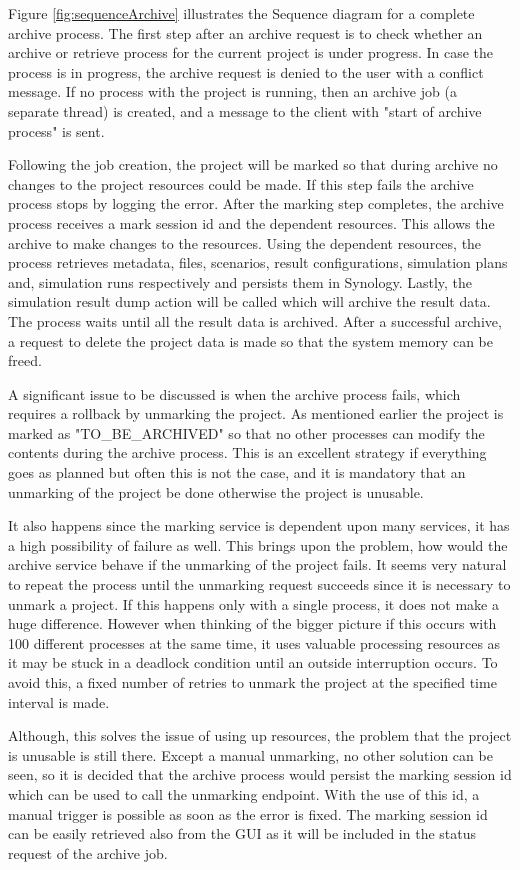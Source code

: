 Figure \ref{fig:sequenceArchive} illustrates the Sequence diagram for a complete archive process. The first step after an archive request is to check
whether an archive or retrieve process for the current project is under progress. In case the process is in progress, the archive request is denied to the
user with a conflict message. If no process with the project is running, then an archive job (a separate thread) is created, and a message to the client with "start of archive process" is
sent. 

Following the job creation, the project will be marked so that during archive no changes to the project resources could be made. If this step fails the archive 
process stops by logging the error. After the marking step completes, the archive process receives a mark session id and the dependent resources. This allows the archive to make
changes to the resources. Using the dependent resources, the process retrieves metadata, files, scenarios, result configurations, simulation plans and, simulation runs 
respectively and persists them in Synology. Lastly, the simulation result dump action will be called which will archive the result data. The process waits until
all the result data is archived. After a successful archive, a request to delete the project data is made so that the system memory can be freed.

A significant issue to be discussed is when the archive process fails, which requires a rollback by unmarking the project. As mentioned earlier the project is
marked as "TO\_BE\_ARCHIVED" so that no other processes can modify the contents during the archive process. This is an excellent strategy if everything goes as planned but 
often this is not the case, and it is mandatory that an unmarking of the project be done otherwise the project is unusable. 

It also happens since the
marking service is dependent upon many services, it has a high possibility of failure as well. This brings upon the problem, how would the archive service behave if the
unmarking of the project fails. It seems very natural to repeat the process until the unmarking request succeeds since it is necessary to unmark
a project. If this happens only with a single process, it does not make a huge difference. However when thinking of the bigger picture if this 
occurs with 100 different processes at the same time, it uses valuable processing resources as it may be stuck in a deadlock condition until an outside interruption occurs. 
To avoid this, a fixed number of retries to unmark the project at the specified time interval is made. 

Although, this solves the issue of using up resources, the problem that the project is unusable is still there. Except a manual unmarking, no other solution 
can be seen, so 
it is decided that the archive process would persist the marking session id which can be used to call the unmarking endpoint. With the use of this id, a manual 
trigger is possible as soon as the error is fixed. The marking session id can be easily retrieved also from the GUI as it will be included in the status request of
the archive job.
 